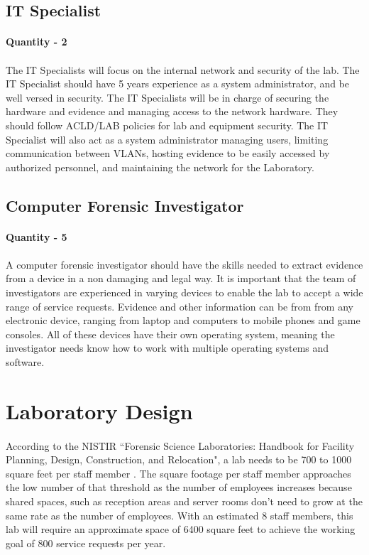 \documentclass[12pt]{article}
\begin{document}
\subsection{IT Specialist}
\paragraph{Quantity - 2}
\paragraph{}
The IT Specialists will focus on the internal network and security of the lab.
The IT Specialist should have 5 years experience as a system administrator, and be well versed in security.
The IT Specialists will be in charge of securing the hardware and evidence and managing access to the network hardware.
They should follow ACLD/LAB policies for lab and equipment security.
The IT Specialist will also act as a system administrator managing users, limiting communication between VLANs, hosting evidence to be easily accessed by authorized personnel, and maintaining the network for the Laboratory.

\subsection{Computer Forensic Investigator}
\paragraph{Quantity - 5}
\paragraph{}
A computer forensic investigator should have the skills needed to extract evidence from a device in a non damaging and legal way.
It is important that the team of investigators are experienced in varying devices to enable the lab to accept a wide range of service requests.
Evidence and other information can be from from any electronic device, ranging from laptop and computers to mobile phones and game consoles.
All of these devices have their own operating system, meaning the investigator needs know how to work with multiple operating systems and software.

\section{Laboratory Design}
\paragraph{} According to the NISTIR ``Forensic Science Laboratories: Handbook for Facility Planning, Design, Construction, and Relocation", a lab needs to be 700 to 1000 square feet per staff member \cite{pdf}.
The square footage per staff member approaches the low number of that threshold as the number of employees increases because shared spaces, such as reception areas and server rooms don't need to grow at the same rate as the number of employees.
With an estimated 8 staff members, this lab will require an approximate space of 6400 square feet to achieve the working goal of 800 service requests per year.
\end{document}
